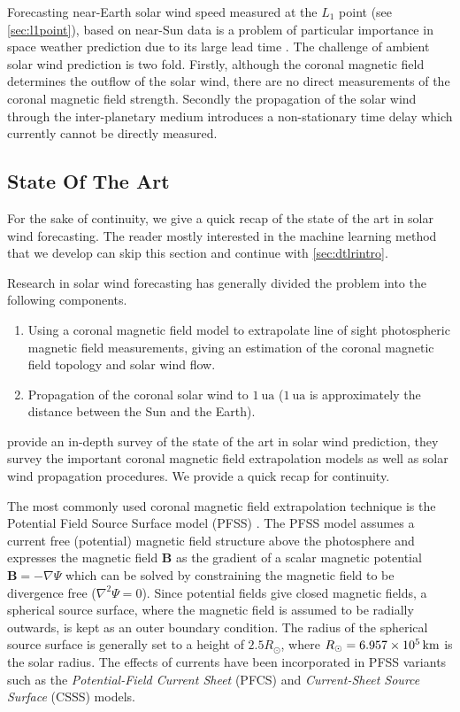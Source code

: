 Forecasting near-Earth solar wind speed measured at the $L_1$ point (see \cref{sec:l1point}), 
based on near-Sun data is a problem of particular importance in space weather prediction due to its 
large lead time \citep{doi:10.1002/jgra.50429,doi:10.1029/2009SW000542}. The challenge of ambient 
solar wind prediction is two fold. Firstly, although the coronal magnetic field determines the 
outflow of the solar wind, there are no direct measurements of the coronal magnetic field strength. 
Secondly the propagation of the solar wind through the inter-planetary medium introduces a 
non-stationary time delay which currently cannot be directly measured. 

\subsection{State Of The Art}\label{sec:solarwindsota}
For the sake of continuity, we give a quick recap of the state of the art in solar wind 
forecasting. The reader mostly interested in the machine learning method that we develop can skip 
this section and continue with \cref{sec:dtlrintro}.  

Research in solar wind forecasting has generally divided the problem into the following components.
%
\begin{enumerate} 
  \item Using a coronal magnetic field model to extrapolate line of sight photospheric magnetic 
        field measurements, giving an estimation of the coronal magnetic field topology and 
        solar wind flow.
  \item Propagation of the coronal solar wind to $\SI{1}{\astronomicalunit}$ 
        ($\SI{1}{\astronomicalunit}$ is approximately the distance between the Sun and the Earth).
\end{enumerate} 
%
\citet{Reiss_2019} provide an in-depth survey of the state of the art in solar wind prediction, 
they survey the important coronal magnetic field extrapolation models as well as solar wind 
propagation procedures. We provide a quick recap for continuity.

The most commonly used coronal magnetic field extrapolation technique is the Potential Field Source 
Surface model (PFSS) \citep{altschuler1969magnetic,schatten1969model}. The PFSS model assumes a 
current free (potential) magnetic field structure above the photosphere and expresses the magnetic 
field $\mathbf{B}$ as the gradient of a scalar magnetic potential $\mathbf{B} = -\nabla \Psi$ which 
can be solved by constraining the magnetic field to be divergence free ($\nabla^{2}\Psi = 0$). 
Since potential fields give closed magnetic fields, a spherical source surface, where the magnetic 
field is assumed to be radially outwards, is kept as an outer boundary condition. The radius of the 
spherical source surface is generally set to a height of 
$2.5 R_{\odot}$, where $R_{\odot} = \SI{6.957d5}{\kilo\metre}$ is the solar radius. The effects of 
currents have been incorporated in PFSS variants such as the \emph{Potential-Field Current Sheet} 
(PFCS) \citep{schatten1971current} and \emph{Current-Sheet Source Surface} (CSSS) \citep{csss} 
models. 


